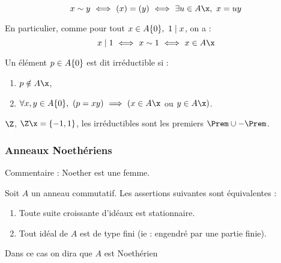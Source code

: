 \begin{prop}

\begin{displaymath}
 x\sim y\ \Longleftrightarrow\ (x) = (y)\ \Longleftrightarrow\ \exists u\in
A\x,\ x = uy
\end{displaymath}

En particulier, comme pour tout $x \in A\-\{0\},\ 1\mid x$, on a
: \begin{displaymath}
 x \mid 1\ \Longleftrightarrow\ x \sim 1 \ \Longleftrightarrow\ x \in
A\x
\end{displaymath} 
\end{prop}

\begin{defi}[Irréductibilité]
  
Un élément $p \in A\-\{0\}$ est dit irréductible si :
\begin{enumerate}
 \item $p\notin A\x$,
 \item $\forall x,y\in A\-\{0\},\ (p = xy)\ \Longrightarrow\ (x\in
A\x$ ou $y\in A\x)$.
\end{enumerate}
\end{defi}

\begin{example}[Example]
 
$\Z$, $\Z\x = \{-1,1\}$, les irréductibles sont les premiers $\Prem \cup
-\Prem$.
\end{example}

\subsubsection{Anneaux Noethériens}
Commentaire : Noether est une femme.
\vspace{0.5em}

\begin{defiprop}

Soit $A$ un anneau commutatif. Les assertions suivantes sont équivalentes :
\begin{enumerate}
 \item Toute suite croissante d'idéaux est stationnaire.
 \item Tout idéal de $A$ est de type fini (ie : engendré par une partie finie).
\end{enumerate}

Dans ce cas on dira que $A$ est Noethérien
\end{defiprop}

